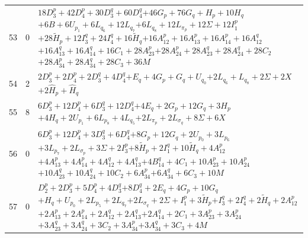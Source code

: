 \documentclass[11pt,a4paper]{article}
\theoremstyle{remark}
\begin{document}
\begin{longtable}{rrp{12.7cm}}
53&0&\( 18D_3^p + 42D_4^p + 30D_3^q + 60D_4^q \)\newline\( + 46G_p + 76G_q + H_p + 10H_q \)\newline\( + 6B + 6U_{p_{1}} + 6L_{q_{6}} + 12L_{q_{7}} \)\newline\( + 6L_{q_{8}} + 12L_{\pi_p} + 12\Sigma + 12I_1^p \)\newline\( + 28\widetilde H_p + 12I_3^q + 24I_4^q + 16\widetilde H_q \)\newline\( + 16A_{12}^p + 16A_{13}^p + 16A_{14}^p + 16A_{12}^q \)\newline\( + 16A_{13}^q + 16A_{14}^q + 16C_1 + 28A_{23}^p \)\newline\( + 28A_{24}^p + 28A_{23}^q + 28A_{24}^q + 28C_2 \)\newline\( + 28A_{34}^p + 28A_{34}^q + 28C_3 + 36M \)\\[3pt]
54&2&\( 2D_3^p + 2D_4^p + 2D_3^q + 4D_4^q \)\newline\( + E_q + 4G_p + G_q + U_{q_{0}} \)\newline\( + 2L_{q_{6}} + L_{q_{8}} + 2\Sigma + 2X \)\newline\( + 2\widehat H_p + \widehat H_q \)\\[3pt]
55&8&\( 6D_3^p + 12D_4^p + 6D_3^q + 12D_4^q \)\newline\( + 4E_q + 2G_p + 12G_q + 3H_p \)\newline\( + 4H_q + 2U_{p_{1}} + 6L_{p_{8}} + 4L_{q_{5}} \)\newline\( + 2L_{\pi_p} + 2L_{\sigma_q} + 8\Sigma + 6X \)\\[3pt]
56&0&\( 6D_3^p + 12D_4^p + 3D_3^q + 6D_4^q \)\newline\( + 8G_p + 12G_q + 2U_{p_{0}} + 3L_{p_{6}} \)\newline\( + 3L_{p_{7}} + 2L_{\sigma_p} + 3\Sigma + 2I_3^p \)\newline\( + 8\widetilde H_p + 2I_1^q + 10\widetilde H_q + 4A_{12}^p \)\newline\( + 4A_{13}^p + 4A_{14}^p + 4A_{12}^q + 4A_{13}^q \)\newline\( + 4B_{14}^q + 4C_1 + 10A_{23}^p + 10A_{24}^p \)\newline\( + 10A_{23}^q + 10A_{24}^q + 10C_2 + 6A_{34}^p \)\newline\( + 6A_{34}^q + 6C_3 + 10M \)\\[3pt]
57&0&\( D_2^p + 2D_3^p + 5D_4^p + 4D_3^q \)\newline\( + 8D_4^q + 2E_q + 4G_p + 10G_q \)\newline\( + H_q + U_{p_{0}} + 2L_{p_{5}} + 2L_{q_{7}} \)\newline\( + 2L_{\sigma_q} + 2\Sigma + I_1^p + 3\widetilde H_p \)\newline\( + I_3^q + 2I_4^q + 2\widetilde H_q + 2A_{12}^p \)\newline\( + 2A_{13}^p + 2A_{14}^p + 2A_{12}^q + 2A_{13}^q \)\newline\( + 2A_{14}^q + 2C_1 + 3A_{23}^p + 3A_{24}^p \)\newline\( + 3A_{23}^q + 3A_{24}^q + 3C_2 + 3A_{34}^p \)\newline\( + 3A_{34}^q + 3C_3 + 4M \)\\[3pt]

\end{longtable}
\end{document}

